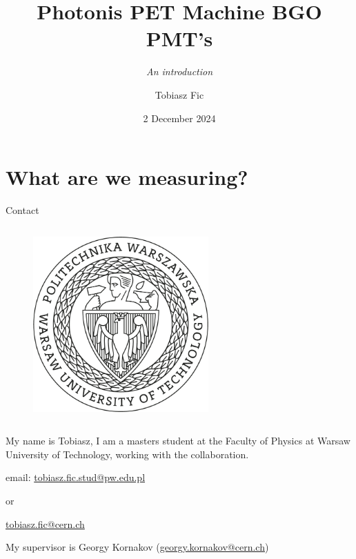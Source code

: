 

\title{Photonis PET Machine BGO PMT's}
    \subtitle{\textit{An introduction}}
\author[T. Fic]{Tobiasz Fic}

\date{2 December 2024}



\begin{frame}
    \maketitle
\end{frame}

\section{What are we measuring?}

\begin{columnframe}{Contact}
    \begin{column}{0.5\textwidth}
        \begin{figure}
            \centering
            \includegraphics[width=0.6\textwidth]{images/logo-PW.png}
        \end{figure}
    \end{column}
    \begin{column}{0.5\textwidth}
        My name is Tobiasz, I am a masters student at the Faculty of Physics at Warsaw University of Technology, working with the \aegis collaboration. \vspace{0.5cm}

        \small{email: \href{mailto:tobiasz.fic.stud@pw.edu.pl}{tobiasz.fic.stud@pw.edu.pl}

            or

            \href{mailto:tobiasz.fic@cern.ch}{tobiasz.fic@cern.ch}}
        \vspace{0.5cm}

        My supervisor is Georgy Kornakov (\href{mailto:georgy.kornakov@cern.ch}{georgy.kornakov@cern.ch})
    \end{column}
\end{columnframe}


